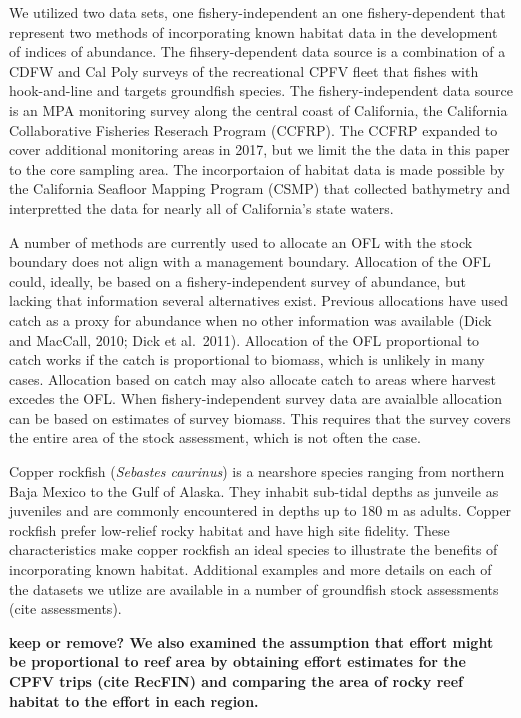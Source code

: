 \documentclass[
  12pt,
  authoryear,
  preprint,
  3p]{elsarticle}
\begin{document}
We utilized two data sets, one fishery-independent an one
fishery-dependent that represent two methods of incorporating known
habitat data in the development of indices of abundance. The
fihsery-dependent data source is a combination of a CDFW and Cal Poly
surveys of the recreational CPFV fleet that fishes with hook-and-line
and targets groundfish species. The fishery-independent data source is
an MPA monitoring survey along the central coast of California, the
California Collaborative Fisheries Reserach Program (CCFRP). The CCFRP
expanded to cover additional monitoring areas in 2017, but we limit the
the data in this paper to the core sampling area. The incorportaion of
habitat data is made possible by the California Seafloor Mapping Program
(CSMP) that collected bathymetry and interpretted the data for nearly
all of California's state waters.

A number of methods are currently used to allocate an OFL with the stock
boundary does not align with a management boundary. Allocation of the
OFL could, ideally, be based on a fishery-independent survey of
abundance, but lacking that information several alternatives exist.
Previous allocations have used catch as a proxy for abundance when no
other information was available (Dick and MacCall, 2010; Dick et
al.~2011). Allocation of the OFL proportional to catch works if the
catch is proportional to biomass, which is unlikely in many cases.
Allocation based on catch may also allocate catch to areas where harvest
excedes the OFL. When fishery-independent survey data are avaialble
allocation can be based on estimates of survey biomass. This requires
that the survey covers the entire area of the stock assessment, which is
not often the case.

Copper rockfish (\emph{Sebastes caurinus}) is a nearshore species
ranging from northern Baja Mexico to the Gulf of Alaska. They inhabit
sub-tidal depths as junveile as juveniles and are commonly encountered
in depths up to 180 m as adults\citep{Love:2002:RNP, Love:1996:XXX}.
Copper rockfish prefer low-relief rocky habitat and have high site
fidelity. These characteristics make copper rockfish an ideal species to
illustrate the benefits of incorporating known habitat. Additional
examples and more details on each of the datasets we utlize are
available in a number of groundfish stock assessments (cite
assessments).

\textbf{keep or remove? We also examined the assumption that effort
might be proportional to reef area by obtaining effort estimates for the
CPFV trips (cite RecFIN) and comparing the area of rocky reef habitat to
the effort in each region.}
\end{document}
